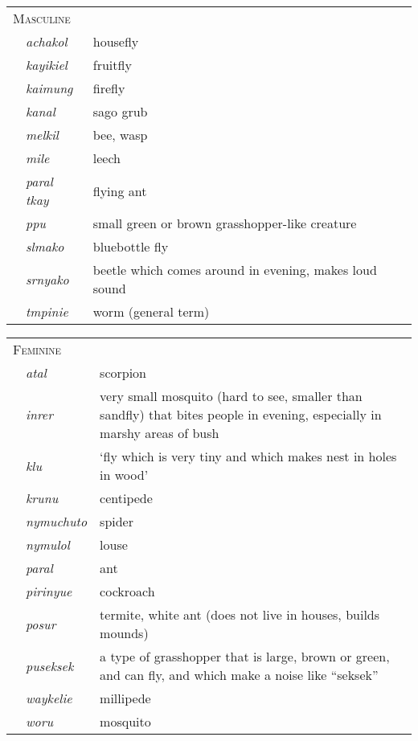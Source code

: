 \documentclass[output=collectionpaper]{langsci/langscibook}
\begin{document}
\begin{tabularx}{0.9\textwidth}{lp{1.8cm}X}
\multicolumn{3}{l}{\textsc{Masculine}}\\
& \textit{achakol} & housefly\\
& \textit{kayikiel} & fruitfly\\
& \textit{kaimung} & firefly\\
& \textit{kanal} & sago grub\\
& \textit{melkil} & bee, wasp\\
& \textit{mile} & leech\\
& \textit{paral tkay} & flying ant\\
& \textit{ppu} & small green or brown grasshopper-like creature\\
& \textit{slmako} & bluebottle fly\\
& \textit{srnyako} & beetle which comes around in evening, makes loud sound\\
& \textit{tmpinie} & worm (general term)\\
\end{tabularx}

\begin{tabularx}{0.9\textwidth}{lp{1.8cm}X}
\multicolumn{3}{l}{\textsc{Feminine}}\\
& \textit{atal} & scorpion\\
& \textit{inrer} & very small mosquito (hard to see, smaller than sandfly) that bites people in evening, especially in marshy areas of bush\\
& \textit{klu} & `fly which is very tiny and which makes nest in holes in wood'\\
& \textit{krunu} & centipede\\
& \textit{nymuchuto} & spider\\
& \textit{nymulol} & louse\\
& \textit{paral} & ant\\
& \textit{pirinyue} & cockroach\\
& \textit{posur} & termite, white ant (does not live in houses, builds mounds)\\
& \textit{puseksek} & a type of grasshopper that is large, brown or green, and can fly, and which make a noise like ``seksek''\\
& \textit{waykelie} & millipede\\
& \textit{woru} & mosquito\\
\end{tabularx}
\z
\end{document}
